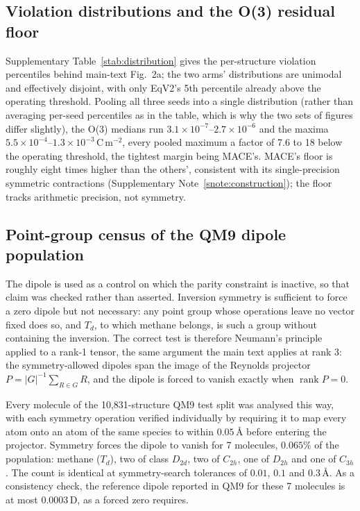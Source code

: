 \subsection*{Violation distributions and the O(3) residual floor}

Supplementary Table~\ref{stab:distribution} gives the per-structure violation percentiles behind main-text Fig.~2a; the two arms' distributions are unimodal and effectively disjoint, with only EqV2's 5th percentile already above the operating threshold. Pooling all three seeds into a single distribution (rather than averaging per-seed percentiles as in the table, which is why the two sets of figures differ slightly), the O(3) medians run $3.1\times10^{-7}$--$2.7\times10^{-6}$ and the maxima $5.5\times10^{-4}$--$1.3\times10^{-3}$\,C\,m$^{-2}$, every pooled maximum a factor of 7.6 to 18 below the operating threshold, the tightest margin being MACE's. MACE's floor is roughly eight times higher than the others', consistent with its single-precision symmetric contractions (Supplementary Note~\ref{snote:construction}); the floor tracks arithmetic precision, not symmetry.

\subsection*{Point-group census of the QM9 dipole population}\label{snote:qm9pg}

The dipole is used as a control on which the parity constraint is inactive, so that claim was checked rather than asserted. Inversion symmetry is sufficient to force a zero dipole but not necessary: any point group whose operations leave no vector fixed does so, and $T_d$, to which methane belongs, is such a group without containing the inversion. The correct test is therefore Neumann's principle applied to a rank-1 tensor, the same argument the main text applies at rank 3: the symmetry-allowed dipoles span the image of the Reynolds projector $P = |G|^{-1}\sum_{R \in G} R$, and the dipole is forced to vanish exactly when $\operatorname{rank} P = 0$.

Every molecule of the 10,831-structure QM9 test split was analysed this way, with each symmetry operation verified individually by requiring it to map every atom onto an atom of the same species to within $0.05$\,\AA{} before entering the projector. Symmetry forces the dipole to vanish for 7 molecules, $0.065\%$ of the population: methane ($T_d$), two of class $D_{2d}$, two of $C_{2h}$, one of $D_{2h}$ and one of $C_{3h}$. The count is identical at symmetry-search tolerances of $0.01$, $0.1$ and $0.3$\,\AA. As a consistency check, the reference dipole reported in QM9 for these 7 molecules is at most $0.0003$\,D, as a forced zero requires.

